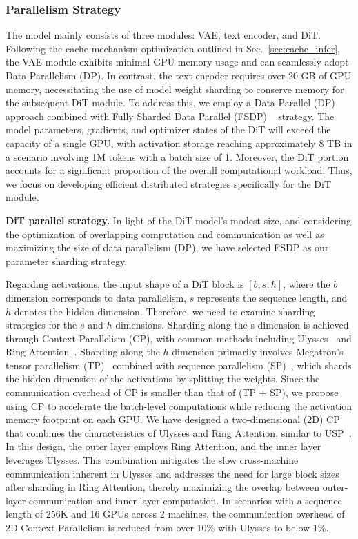 \subsubsection{Parallelism Strategy}
\label{4d_parallel}
The \method model mainly consists of three modules: VAE, text encoder, and DiT. Following the cache mechanism optimization outlined in Sec.~\ref{sec:cache_infer}, the VAE module exhibits minimal GPU memory usage and can seamlessly adopt Data Parallelism (DP). In contrast, the text encoder requires over 20 GB of GPU memory, necessitating the use of model weight sharding to conserve memory for the subsequent DiT module.
To address this, we employ a Data Parallel (DP) approach combined with Fully Sharded Data Parallel (FSDP) ~\citep{zhao2023pytorchfsdp} strategy.
The model parameters, gradients, and optimizer states of the DiT will exceed the capacity of a single GPU, with activation storage reaching approximately 8 TB in a scenario involving 1M tokens with a batch size of 1. Moreover, the DiT portion accounts for a significant proportion of the overall computational workload. Thus, we focus on developing efficient distributed strategies specifically for the DiT module.

\noindent\textbf{DiT parallel strategy.}
In light of the DiT model’s modest size, and considering the optimization of overlapping computation and communication as well as maximizing the size of data parallelism (DP), we have selected FSDP as our parameter sharding strategy.

Regarding activations, the input shape of a DiT block is $[b, s, h]$, where the $b$ dimension corresponds to data parallelism, $s$ represents the sequence length, and $h$ denotes the hidden dimension. Therefore, we need to examine sharding strategies for the $s$ and $h$ dimensions. Sharding along the s dimension is achieved through Context Parallelism (CP), with common methods including Ulysses~\citep{jacobs2023deepspeedulysses} and Ring Attention~\citep{liu2023ringattention}. Sharding along the $h$ dimension primarily involves Megatron’s tensor parallelism (TP)~\citep{megatron} combined with sequence parallelism (SP)~\citep{korthikanti2022megatronsp}, which shards the hidden dimension of the activations by splitting the weights.
Since the communication overhead of CP is smaller than that of (TP $+$ SP), we propose using CP to accelerate the batch-level computations while reducing the activation memory footprint on each GPU.
We have designed a two-dimensional (2D) CP that combines the characteristics of Ulysses and Ring Attention, similar to USP~\citep{fang2024usp}. In this design, the outer layer employs Ring Attention, and the inner layer leverages Ulysses. This combination mitigates the slow cross-machine communication inherent in Ulysses and addresses the need for large block sizes after sharding in Ring Attention, thereby maximizing the overlap between outer-layer communication and inner-layer computation. In scenarios with a sequence length of 256K and 16 GPUs across 2 machines, the communication overhead of 2D Context Parallelism is reduced from over $10\%$ with Ulysses to below $1\%$.


